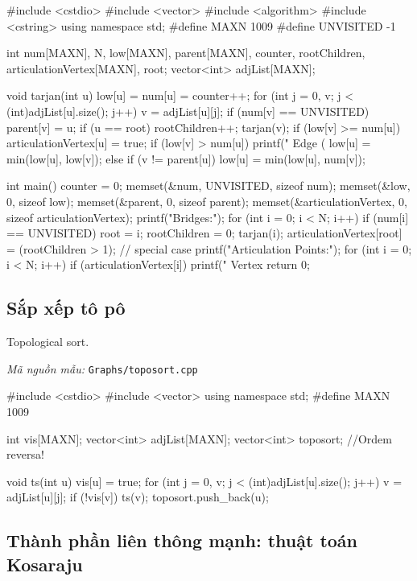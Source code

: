 \documentclass[11pt]{article}
\newcommand{\codepath}[1]{\par\noindent\textit{Mã nguồn mẫu:} \texttt{#1}\par}
\begin{document}
\begingroup\scriptsize
\begin{vncode}
#include <cstdio>
#include <vector>
#include <algorithm>
#include <cstring>
using namespace std;
#define MAXN 1009
#define UNVISITED -1

int num[MAXN], N, low[MAXN], parent[MAXN], counter, rootChildren, articulationVertex[MAXN], root;
vector<int> adjList[MAXN];

void tarjan(int u) {
	low[u] = num[u] = counter++;
	for (int j = 0, v; j < (int)adjList[u].size(); j++) {
		v = adjList[u][j];
		if (num[v] == UNVISITED) {
			parent[v] = u;
			if (u == root) rootChildren++;
			tarjan(v);
			if (low[v] >= num[u]) articulationVertex[u] = true;
			if (low[v] > num[u]) printf(" Edge (%
			low[u] = min(low[u], low[v]);
		}
		else if (v != parent[u])
			low[u] = min(low[u], num[v]);
	}
}

int main() {
	counter = 0;
	memset(&num, UNVISITED, sizeof num);
	memset(&low, 0, sizeof low);
	memset(&parent, 0, sizeof parent);
	memset(&articulationVertex, 0, sizeof articulationVertex);
	printf("Bridges:\n");
	for (int i = 0; i < N; i++)
		if (num[i] == UNVISITED) {
			root = i; rootChildren = 0; tarjan(i);
			articulationVertex[root] = (rootChildren > 1);
		} // special case
	printf("Articulation Points:\n");
	for (int i = 0; i < N; i++)
		if (articulationVertex[i])
			printf(" Vertex %
	return 0;
}
\end{vncode}
\endgroup


\subsection{Sắp xếp tô pô}

Topological sort.

\codepath{Graphs/toposort.cpp}

\begingroup\scriptsize
\begin{vncode}
#include <cstdio>
#include <vector>
using namespace std;
#define MAXN 1009

int vis[MAXN];
vector<int> adjList[MAXN];
vector<int> toposort;	//Ordem reversa!

void ts(int u) {
	vis[u] = true;
	for (int j = 0, v; j < (int)adjList[u].size(); j++) {
		v = adjList[u][j];
		if (!vis[v]) ts(v);
	}
	toposort.push_back(u);
}
\end{vncode}
\endgroup


\subsection{Thành phần liên thông mạnh: thuật toán Kosaraju}
\end{document}
